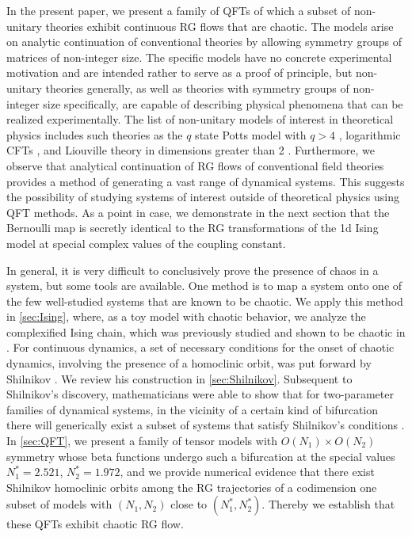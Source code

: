 In the present paper, we present a family of QFTs of which a subset of non-unitary theories exhibit continuous RG flows that are chaotic. The models arise on analytic continuation of conventional theories by allowing symmetry groups of matrices of non-integer size. The specific models have no concrete experimental motivation and are intended rather to serve as a proof of principle, but non-unitary theories generally, as well as theories with symmetry groups of non-integer size specifically, are capable of describing physical phenomena that can be realized experimentally. The list of non-unitary models of interest in theoretical physics includes such theories as the $q$ state Potts model with $q>4$ \cite{1982RvMP...54..235W,gorbenko2018walking,Gorbenko:2018dtm}, logarithmic CFTs \cite{Gurarie:1993xq,cardy2013logarithmic}, and Liouville theory in dimensions greater than 2 \cite{levy2018liouville}. Furthermore, we observe that analytical continuation of RG flows of conventional field theories provides a method of generating a vast range of dynamical systems. This suggests the possibility of studying systems of interest outside of theoretical physics using QFT methods. As a point in case, we demonstrate in the next section that the Bernoulli map is secretly identical to the RG transformations of the 1d Ising model at special complex values of the coupling constant.

In general, it is very difficult to conclusively prove the presence of chaos in a system, but some tools are available. One method is to map a system onto one of the few well-studied systems that are known to be chaotic. We apply this method in \cref{sec:Ising}, where, as a toy model with chaotic behavior, we analyze the complexified Ising chain, which was previously studied and shown to be chaotic in \cite{Dolan:1994wt}. For continuous dynamics, a set of necessary conditions for the onset of chaotic dynamics, involving the presence of a homoclinic orbit, was put forward by Shilnikov \cite{shilnikov1965case}. We review his construction in \cref{sec:Shilnikov}. Subsequent to Shilnikov's discovery, mathematicians were able to show that for two-parameter families of dynamical systems, in the vicinity of a certain kind of bifurcation there will generically exist a subset of systems that satisfy Shilnikov's conditions \cite{baldoma2020hopf}. In \cref{sec:QFT}, we present a family of tensor models with $O(N_1)\times O(N_2)$ symmetry whose beta functions undergo such a bifurcation at the special values $N^\ast_1=2.521$, $N^\ast_2=1.972$, and we provide numerical evidence that there exist Shilnikov homoclinic orbits among the RG trajectories of a codimension one subset of models with $(N_1,N_2)$ close to $(N^\ast_1,N^\ast_2)$. Thereby we establish that these QFTs exhibit chaotic RG flow.



